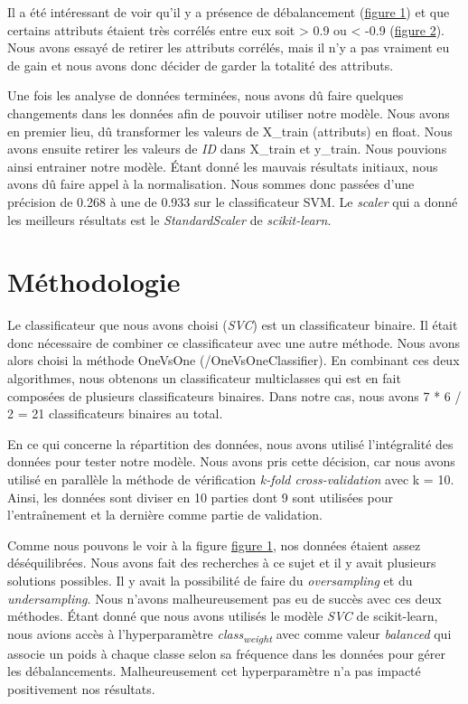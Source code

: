 \documentclass[12pt]{extarticle}
\begin{document}
\vspace{5mm}

Il a été intéressant de voir qu'il y a présence de débalancement (\hyperref[fig:barchart]{figure 1}) et que certains attributs étaient très corrélés entre eux soit > 0.9 ou < -0.9 (\hyperref[fig:heatmap]{figure 2}). Nous avons essayé de retirer les attributs corrélés, mais il n'y a pas vraiment eu de gain et nous avons donc décider de garder la totalité des attributs.

Une fois les analyse de données terminées, nous avons dû faire quelques changements dans les données afin de pouvoir utiliser notre modèle. Nous avons en premier lieu, dû transformer les valeurs de X\_train (attributs) en float. Nous avons ensuite retirer les valeurs de \emph{ID} dans X\_train et y\_train. Nous pouvions ainsi entrainer notre modèle. Étant donné les mauvais résultats initiaux, nous avons dû faire appel à la normalisation. Nous sommes donc passées d'une précision de 0.268 à une de 0.933 sur le classificateur SVM. Le \emph{scaler} qui a donné les meilleurs résultats est le \emph{StandardScaler} de \emph{scikit-learn}.

\section{Méthodologie}
\label{sec:org7af4dea}
Le classificateur que nous avons choisi (\emph{SVC}) est un classificateur binaire. Il était donc nécessaire de combiner ce classificateur avec une autre méthode. Nous avons alors choisi la méthode OneVsOne (/OneVsOneClassifier). En combinant ces deux algorithmes, nous obtenons un classificateur multiclasses qui est en fait composées de plusieurs classificateurs binaires. Dans notre cas, nous avons 7 * 6 / 2 = 21 classificateurs binaires au total.

En ce qui concerne la répartition des données, nous avons utilisé l'intégralité des données pour tester notre modèle. Nous avons pris cette décision, car nous avons utilisé en parallèle la méthode de vérification \emph{k-fold cross-validation} avec k = 10. Ainsi, les données sont diviser en 10 parties dont 9 sont utilisées pour l'entraînement et la dernière comme partie de validation.

Comme nous pouvons le voir à la figure \hyperref[fig:barchart]{figure 1}, nos données étaient assez déséquilibrées. Nous avons fait des recherches à ce sujet et il y avait plusieurs solutions possibles. Il y avait la possibilité de faire du \emph{oversampling} et du \emph{undersampling}. Nous n'avons malheureusement pas eu de succès avec ces deux méthodes. Étant donné que nous avons utilisés le modèle \emph{SVC} de scikit-learn, nous avions accès à l'hyperparamètre \emph{class\textsubscript{weight}} avec comme valeur \emph{balanced} qui associe un poids à chaque classe selon sa fréquence dans les données pour gérer les débalancements. Malheureusement cet hyperparamètre n'a pas impacté positivement nos résultats.
\end{document}
